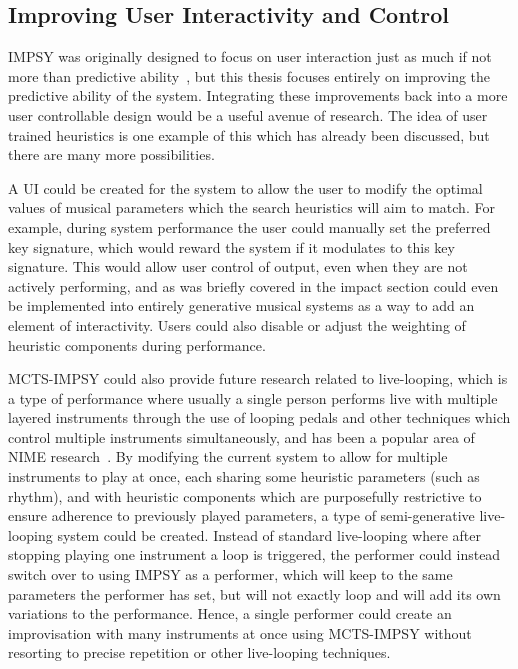 \subsection{Improving User Interactivity and Control}

IMPSY was originally designed to focus on user interaction just as much if not more than predictive ability~\citep{Martin2019IMPSY}, but this thesis focuses entirely on improving the predictive ability of the system. Integrating these improvements back into a more user controllable design would be a useful avenue of research. The idea of user trained heuristics is one example of this which has already been discussed, but there are many more possibilities.

A UI could be created for the system to allow the user to modify the optimal values of musical parameters which the search heuristics will aim to match. For example, during system performance the user could manually set the preferred key signature, which would reward the system if it modulates to this key signature. This would allow user control of output, even when they are not actively performing, and as was briefly covered in the impact section could even be implemented into entirely generative musical systems as a way to add an element of interactivity. Users could also disable or adjust the weighting of heuristic components during performance.

MCTS-IMPSY could also provide future research related to live-looping, which is a type of performance where usually a single person performs live with multiple layered instruments through the use of looping pedals and other techniques which control multiple instruments simultaneously, and has been a popular area of NIME research~\citep{Barbosa2017LiveLooping}. By modifying the current system to allow for multiple instruments to play at once, each sharing some heuristic parameters (such as rhythm), and with heuristic components which are purposefully restrictive to ensure adherence to previously played parameters, a type of semi-generative live-looping system could be created. Instead of standard live-looping where after stopping playing one instrument a loop is triggered, the performer could instead switch over to using IMPSY as a performer, which will keep to the same parameters the performer has set, but will not exactly loop and will add its own variations to the performance. Hence, a single performer could create an improvisation with many instruments at once using MCTS-IMPSY without resorting to precise repetition or other live-looping techniques.



